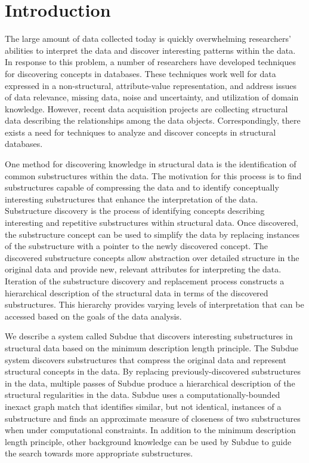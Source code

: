 \section{Introduction}
\label{s:intro}

The large amount of data collected today is quickly overwhelming researchers'
abilities to interpret the data and discover interesting patterns within the
data.  In response to this problem, a number of researchers have developed
techniques for discovering concepts in databases.
These techniques work well for data expressed in a non-structural,
attribute-value representation, and address issues of data relevance, missing
data, noise and uncertainty, and utilization of domain knowledge.
However, recent data acquisition projects
are collecting structural data describing the relationships
among the data objects.  Correspondingly, there exists a need for techniques
to analyze and discover concepts in structural databases.

One method for discovering knowledge in structural data is the identification of
common substructures within the data.
The motivation for this process is to find substructures capable of compressing
the data and to identify conceptually interesting substructures that enhance
the interpretation of the data.
Substructure discovery is the process of identifying concepts describing
interesting and repetitive substructures within structural data.
Once discovered, the substructure concept can be used to simplify the data by
replacing instances of the substructure with a pointer to the newly
discovered concept.  The discovered substructure concepts allow abstraction over
detailed structure in the original data and provide new, relevant attributes
for interpreting the data.  Iteration of the substructure discovery and
replacement process constructs a hierarchical description of the structural
data in terms of the discovered substructures.  This hierarchy provides varying
levels of interpretation that can be accessed based on the goals of the
data analysis.

We describe a system called {\sc Subdue} \cite{HCB92,HC93}
that discovers interesting substructures in structural data based on
the minimum description length principle.  The {\sc Subdue} system
discovers substructures that compress the original data and represent
structural concepts in the data.  By replacing previously-discovered
substructures in the data, multiple passes of {\sc Subdue} produce a
hierarchical description of the structural regularities in the data.  {\sc
Subdue} uses a computationally-bounded inexact graph match that identifies
similar, but not identical, instances of a substructure and finds an
approximate measure of closeness of two substructures when under
computational constraints.  In addition to the minimum description length
principle, other background knowledge can be used by {\sc Subdue} to guide
the search towards more appropriate substructures.

